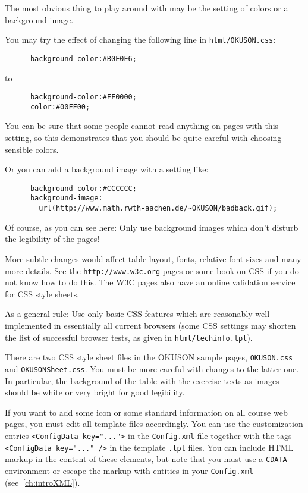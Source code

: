 \documentclass[12pt,openany,a4paper]{book}
\newcommand{\OKUSON}{\textsf{OKUSON}}
\begin{document}
The most obvious thing to play around with may be the setting of colors or a
background image.

You may try the effect of changing the following line in
\texttt{html/OKUSON.css}:

\begin{verbatim}
      background-color:#B0E0E6;
\end{verbatim}

to

\begin{verbatim}
      background-color:#FF0000;
      color:#00FF00;
\end{verbatim}

You can be sure that some people cannot read anything on  pages with 
this setting, so this demonstrates that you should be quite careful with
choosing sensible colors. 

Or you can add a background image with a setting like:

\begin{verbatim}
      background-color:#CCCCCC;
      background-image:
        url(http://www.math.rwth-aachen.de/~OKUSON/badback.gif);
\end{verbatim}

Of course, as you can see here: Only use background images which don't
disturb the legibility of the pages!

More subtle changes would affect  table layout, fonts, relative font
sizes and many more details. See the 
\href{http://www.w3c.org}{\texttt{http://www.w3c.org}} pages or some book on
CSS if you do not know how to do this. The W3C pages also have an online 
validation service  for CSS style sheets.

As a general rule: Use only basic CSS features which are reasonably well 
implemented in essentially all current browsers (some CSS settings may
shorten the list of successful browser tests, as given in
\texttt{html/techinfo.tpl}).

There are two CSS style sheet files in the {\OKUSON} sample pages, 
\texttt{OKUSON.css} and \texttt{OKUSONSheet.css}. You must be more careful
with changes to the latter one. In particular, the background of the table
with the exercise texts as images should be white or very bright for good
legibility.

If you want to add some icon or some standard information on all course 
web pages, you must edit all template files accordingly. You can use the 
customization entries \texttt{<ConfigData key="...">} 
in the \texttt{Config.xml} file together with the tags 
\texttt{<ConfigData key="..." />} in the  template \texttt{.tpl} files. 
You can include HTML markup in the content of these elements, but note 
that you must use a \texttt{CDATA} environment or escape the markup with 
entities in your \texttt{Config.xml} (see~\ref{ch:introXML}). 
\end{document}
